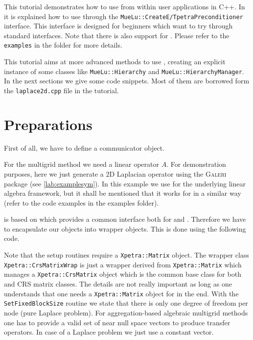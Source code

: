 \documentclass[10pt,fleqn]{book}
\providecommand\printCppListing[1]{

}
\begin{document}
This tutorial demonstrates how to use \muelu from within user applications in C++. In \cite[Section 2.6]{Mue} it is explained how to use \muelu through the \texttt{MueLu::CreateE/TpetraPreconditioner} interface. This interface is designed for beginners which want to try \muelu through standard \trilinos interfaces. Note that there is also support for \stratimikos. Please refer to the \texttt{examples} in the \muelu folder for more details.

This tutorial aims at more advanced methods to use \muelu, creating an explicit instance of some \muelu classes like \texttt{MueLu::Hierarchy} and \texttt{MueLu::HierarchyManager}. In the next sections we give some code snippets. Most of them are borrowed form the \texttt{laplace2d.cpp} file in the tutorial.

\section{Preparations}
First of all, we have to define a communicator object.
\printCppListing{laplace2d.cpp_2.fragment}

For the multigrid method we need a linear operator $A$. For demonstration purposes, here we just generate a 2D Laplacian operator using the \textsc{Galeri} package (see \ref{lab:examplesym}). In this example we use \epetra for the underlying linear algebra framework, but it shall be mentioned that it works for \tpetra in a similar way (refer to the code examples in the \muelu examples folder).
\printCppListing{laplace2d.cpp_4.fragment}

\muelu is based on \xpetra which provides a common interface both for \epetra and \tpetra. Therefore we have to encapsulate our \epetra objects into \xpetra wrapper objects. This is done using the following code.
\printCppListing{laplace2d.cpp_6.fragment}
Note that the \muelu setup routines require a \texttt{Xpetra::Matrix} object. The wrapper class \texttt{Xpetra::CrsMatrixWrap} is just a wrapper derived from \texttt{Xpetra::Matrix} which manages a \texttt{Xpetra::CrsMatrix} object which is the common base class for both \epetra and \tpetra CRS matrix classes. The details are not really important as long as one understands that one needs a \texttt{Xpetra::Matrix} object for \muelu in the end.
With the \texttt{SetFixedBlockSize} routine we state that there is only one degree of freedom per node (pure Laplace problem).
For aggregation-based algebraic multigrid methods one has to provide a valid set of near null space vectors to produce transfer operators. In case of a Laplace problem we just use a constant vector.
\printCppListing{laplace2d.cpp_8.fragment}
\end{document}
